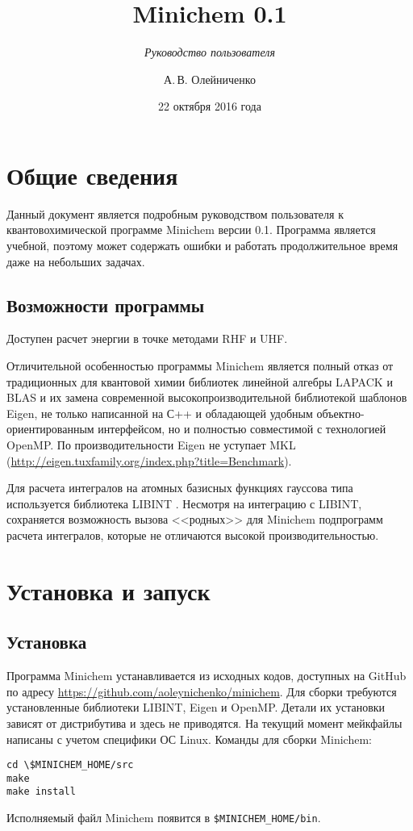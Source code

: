 \documentclass[a4paper]{book}
\title{Minichem 0.1}
\subtitle{\textit{Руководство пользователя}}
\author{А.\,В. Олейниченко}
\date{22 октября 2016 года}
\begin{document}
\maketitle

\chapter{Общие сведения}
Данный документ является подробным руководством пользователя к квантовохимической программе Minichem версии 0.1.
Программа является учебной, поэтому может содержать ошибки и работать продолжительное время даже на небольших задачах.

\section{Возможности программы}
Доступен расчет энергии в точке методами RHF и UHF.

Отличительной особенностью программы Minichem является полный отказ от традиционных для квантовой химии библиотек линейной алгебры
LAPACK и BLAS и их замена современной высокопроизводительной библиотекой шаблонов Eigen, не только написанной на С++ и обладающей удобным
объектно-ориентированным интерфейсом, но и полностью совместимой с технологией OpenMP. По производительности Eigen не уступает MKL
(\url{http://eigen.tuxfamily.org/index.php?title=Benchmark}).

Для расчета интегралов на атомных базисных функциях гауссова типа используется библиотека LIBINT \cite{libint2}. Несмотря на интеграцию с LIBINT,
сохраняется возможность вызова <<родных>> для Minichem подпрограмм расчета интегралов, которые не отличаются высокой производительностью.

\chapter{Установка и запуск}
\section{Установка}
Программа Minichem устанавливается из исходных кодов, доступных на GitHub по адресу \url{https://github.com/aoleynichenko/minichem}.
Для сборки требуются установленные библиотеки LIBINT, Eigen и OpenMP. Детали их установки зависят от дистрибутива и здесь не приводятся.
На текущий момент мейкфайлы написаны с учетом специфики ОС Linux.
Команды для сборки Minichem:

\begin{lstlisting}
cd \$MINICHEM_HOME/src
make
make install
\end{lstlisting}
Исполняемый файл Minichem появится в \texttt{\$MINICHEM\_HOME/bin}.
\end{document}
